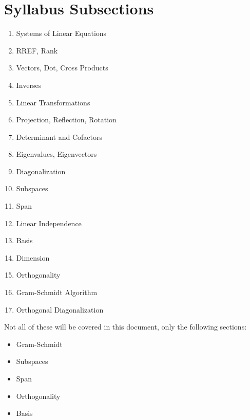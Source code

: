 \documentclass[10pt, twocolumn] {article}
\begin{document}
\section{Syllabus Subsections}
    \begin{enumerate}
         \item{Systems of Linear Equations}
         \item{RREF, Rank}
         \item{Vectors, Dot, Cross Products}
         \item{Inverses}
         \item{Linear Transformations}
         \item{Projection, Reflection, Rotation}
         \item{Determinant and Cofactors}
         \item{Eigenvalues, Eigenvectors}
         \item Diagonalization
         \item{Subspaces}
         \item{Span}
         \item{Linear Independence}
         \item{Basis}
         \item{Dimension}
         \item{Orthogonality}
         \item{Gram-Schmidt Algorithm}
         \item{Orthogonal Diagonalization}
     \end{enumerate}
     \vspace{10mm}
     Not all of these will be covered in this document, only the following sections:
     \begin{itemize}
         \item Gram-Schmidt
         \item Subspaces
         \item Span
         \item Orthogonality
         \item Basis
     \end{itemize}
\end{document}
